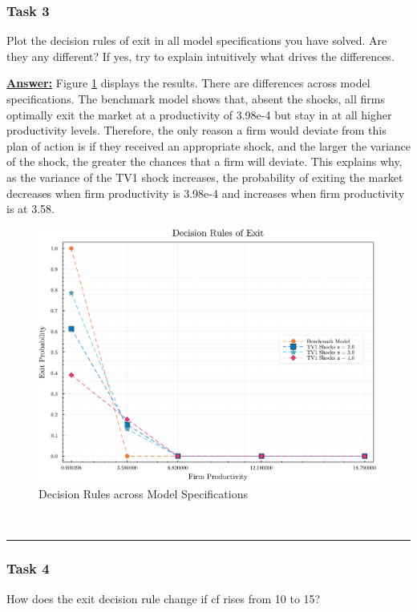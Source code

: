 \documentclass{article} %
\theoremstyle{definition}
\newenvironment{solution}[1][Answer]{\begin{singlespace}\underline{\textbf{#1:}}\quad }{\ \rule{0.3em}{0.3em}\end{singlespace}} %
\begin{document}
\subsubsection*{Task 3}
Plot the decision rules of exit in all model specifications you have solved. Are they any different? If yes, try to explain intuitively what drives the differences.
\begin{solution}
Figure \ref{T3} displays the results. There are differences across model specifications.  The benchmark model shows that, absent the shocks, all firms optimally exit the market at a productivity of 3.98e-4 but stay in at all higher productivity levels. Therefore, the only reason a firm would deviate from this plan of action is if they received an appropriate shock, and the larger the variance of the shock, the greater the chances that a firm will deviate. This explains why, as the variance of the TV1 shock increases, the probability of exiting the market decreases when firm productivity is 3.98e-4 and increases when firm productivity is at 3.58.
	\begin{figure}[htbp]
	\begin{center}
	\includegraphics[scale=.35]{Figures/decision_rules.pdf}
	\caption{Decision Rules across Model Specifications}
	\label{T3}
	\end{center}
	\end{figure}
\end{solution}

\subsubsection*{Task 4}
How does the exit decision rule change if cf rises from 10 to 15?
\end{document}
